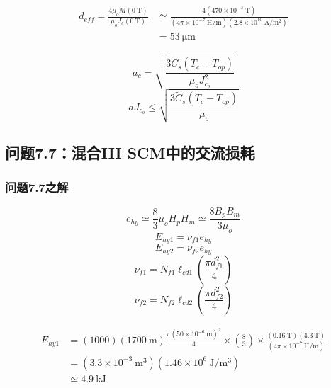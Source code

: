 \begin{align*}%
d_{eff}=\frac{4\mu_oM(0\ \mathrm{T})}{\mu_oJ_c(0\ \mathrm{T})}&\simeq\frac{4(470\times 10^{-3}\ \mathrm{T})}{(4\pi\times 10^{-7}\ \mathrm{H/m})(2.8\times10^{10}\ \mathrm{A/m^2})}\\
&=53\ \mathrm{\mu m}
\end{align*}

\begin{equation}%
a_c=\sqrt{\frac{3\tilde{C}_s(T_c-T_{op})}{\mu_oJ_{c_o}^{2}}}
\end{equation}
\begin{equation}%
aJ_{c_o}\leq\sqrt{\frac{3\tilde{C}_s(T_c-T_{op})}{\mu_o}}
\end{equation}


\subsection{问题7.7：混合III SCM中的交流损耗}




\subsubsection{问题7.7之解}
\begin{equation}%
e_{hy}\simeq\frac{8}{3}\mu_oH_pH_m 
\simeq\frac{8B_pB_m}{3\mu_o}
\end{equation}
\begin{equation}%
E_{hy1}=\nu_{f1}e_{hy}
\end{equation}
\begin{equation}%
E_{hy2}=\nu_{f2}e_{hy}
\end{equation}
\begin{equation}%
\nu_{f1}=N_{f1}\ell_{cd1}\left(\frac{\pi d_{f1}^{2}}{4}\right)
\end{equation}
\begin{equation}%
\nu_{f2}=N_{f2}\ell_{cd2}\left(\frac{\pi d_{f2}^{2}}{4}\right)
\end{equation}



\begin{align*}%
E_{hy1}&=(1000)(1700\ \mathrm{m})\frac{\pi(50\times 10^{-6}\ \mathrm{m})^2}{4} 
\times\left(\frac{8}{3}\right)\times\frac{(0.16\ \mathrm{T})(4.3\ \mathrm{T})}{(4\pi\times 10^{-7}\ \mathrm{H/m})} \\
&=(3.3\times 10^{-3}\ \mathrm{m^3})(1.46\times 10^6\ \mathrm{J/m^3})\\
&\simeq 4.9\ \mathrm{kJ}
\end{align*}


